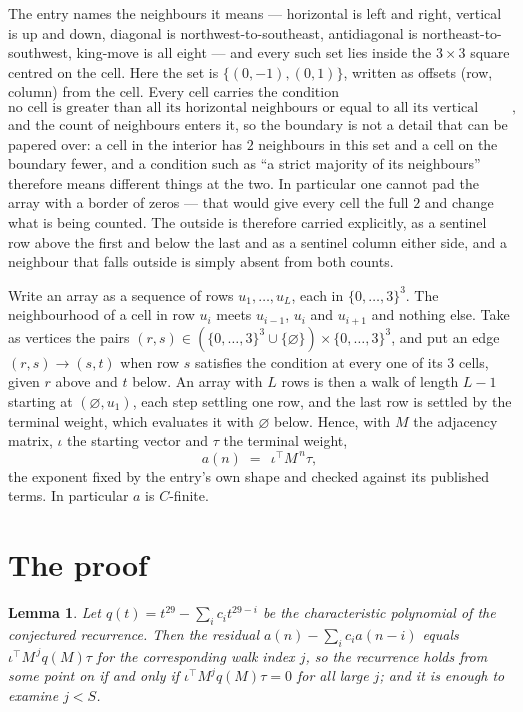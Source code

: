 \documentclass[11pt,a4paper]{article}
\theoremstyle{plain}
\newtheorem{lemma}[theorem]{Lemma}
\theoremstyle{definition}
\begin{document}
The entry names the neighbours it means --- horizontal is left and right, vertical is up and
down, diagonal is northwest-to-southeast, antidiagonal is northeast-to-southwest, king-move is
all eight --- and every such set lies inside the $3\times3$ square centred on the cell. Here
the set is $\{(0,-1), (0,1)\}$, written as offsets (row, column) from the cell. Every cell carries
the condition
\[
\text{no cell is greater than all its horizontal neighbours or equal to all its vertical neighbours},
\]
and the count of neighbours enters it, so the boundary is not a detail that can be papered
over: a cell in the interior has $2$ neighbours in this set and a cell on the boundary
fewer, and a condition such as ``a strict majority of its neighbours'' therefore means
different things at the two. In particular one cannot pad the array with a border of zeros ---
that would give every cell the full $2$ and change what is being counted. The outside is
therefore carried
explicitly, as a sentinel row above the first and below the last and as a sentinel column
either side, and a neighbour that falls outside is simply absent from both counts.

Write an array as a sequence of rows $u_1,\dots,u_L$, each in
$\{0,\dots,3\}^{3}$. The neighbourhood of a cell in row $u_i$ meets $u_{i-1}$,
$u_i$ and $u_{i+1}$ and nothing else. Take as vertices the pairs
$(r,s)\in(\{0,\dots,3\}^{3}\cup\{\varnothing\})\times\{0,\dots,3\}^{3}$,
and put an edge $(r,s)\to(s,t)$ when row $s$ satisfies the condition at every one of its
$3$ cells, given $r$ above and $t$ below. An array with $L$ rows is then a walk of length
$L-1$ starting at $(\varnothing,u_1)$, each step settling one row, and the last row is
settled by the terminal weight, which evaluates it with $\varnothing$ below. Hence,
with $M$ the adjacency matrix, $\iota$ the starting vector and $\tau$ the terminal weight,
\[
a(n)\;=\;\,\iota^{\!\top}M^{\,n}\tau ,
\]
the exponent fixed by the entry's own shape and checked against its published terms. In
particular $a$ is $C$-finite.

\section{The proof}

\begin{lemma}\label{lem:crit}
Let $q(t)=t^{29}-\sum_i c_it^{29-i}$ be the characteristic polynomial of the
conjectured recurrence. Then the residual $a(n)-\sum_ic_ia(n-i)$ equals
$\iota^{\!\top}M^{\,j}q(M)\tau$ for the corresponding walk index $j$, so the
recurrence holds from some point on if and only if $\iota^{\!\top}M^{j}q(M)\tau=0$ for all
large $j$; and it is enough to examine $j<S$.
\end{lemma}
\end{document}
